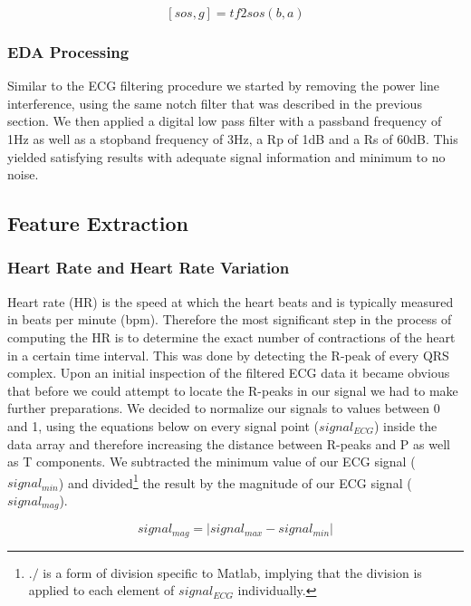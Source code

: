 \begin{equation}\label{tf2}
[sos,g] = tf2sos(b,a)
\end{equation}

\subsubsection{EDA Processing}
Similar to the ECG filtering procedure we started by removing the power line interference, using the same notch filter that was described in the previous section. We then applied a digital low pass filter with a passband frequency of 1Hz as well as a stopband frequency of 3Hz, a Rp of 1dB and a Rs of 60dB. This yielded satisfying results with adequate signal information and minimum to no noise. 

\subsection{Feature Extraction}
\subsubsection{Heart Rate and Heart Rate Variation}\label{HRHRV}
Heart rate (HR) is the speed at which the heart beats and is typically measured in beats per minute (bpm). Therefore the most significant step in the process of computing the HR is to determine the exact number of contractions of the heart in a certain time interval. This was done by detecting the R-peak of every QRS complex. Upon an initial inspection of the filtered ECG data it became obvious that before we could attempt to locate the R-peaks in our signal we had to make further preparations. 
We decided to normalize our signals to values between 0 and 1, using the equations below on every signal point ($signal_{ECG}$) inside the data array and therefore increasing the distance between R-peaks and P as well as T components. We subtracted the minimum value of our ECG signal ($signal_{min}$) and divided\footnote{$./$ is a form of division specific to Matlab, implying that the division is applied to each element of $signal_{ECG}$ individually.} the result by the magnitude of our ECG signal ($signal_{mag}$). 

\begin{equation}
signal_{mag} = |signal_{max} - signal_{min}|
\end{equation}

